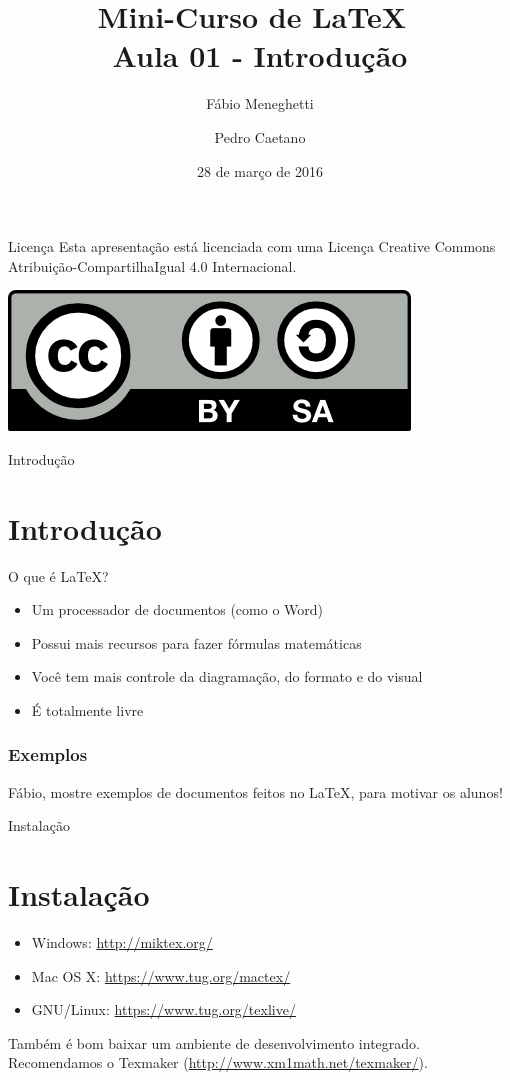 \documentclass[12pt]{beamer}
\title{Mini-Curso de \LaTeX\ \\ Aula 01 - Introdução}
\author{Fábio Meneghetti \and Pedro Caetano}
\date{28 de março de 2016}
\begin{document}
\begin{frame}
  \titlepage
\end{frame}

\begin{frame}{Licença}
  Esta apresentação está licenciada com uma Licença Creative Commons Atribuição-CompartilhaIgual 4.0 Internacional.
  \begin{center}
    \includegraphics[scale=0.3]{../license.png}
  \end{center}
\end{frame}

\begin{frame}
  \tableofcontents
\end{frame}

\begin{frame}{Introdução}
  \section{Introdução}
  \begin{large}O que é \LaTeX?\end{large}

  \begin{itemize}
    \item Um processador de documentos (como o Word)
    \item Possui mais recursos para fazer fórmulas matemáticas
    \item Você tem mais controle da diagramação, do formato e do visual
    \item É totalmente livre
  \end{itemize}

\end{frame}

\begin{frame}
  \frametitle{Exemplos}
  Fábio, mostre exemplos de documentos feitos no \LaTeX, para motivar os alunos!
\end{frame}

\begin{frame}{Instalação}
  \section{Instalação}
  \begin{itemize}
    \item Windows: \url{http://miktex.org/}
    \item Mac OS X: \url{https://www.tug.org/mactex/}
    \item GNU/Linux: \url{https://www.tug.org/texlive/}
  \end{itemize}
  Também é bom baixar um ambiente de desenvolvimento integrado. Recomendamos o Texmaker (\url{http://www.xm1math.net/texmaker/}).
\end{frame}
\end{document}
